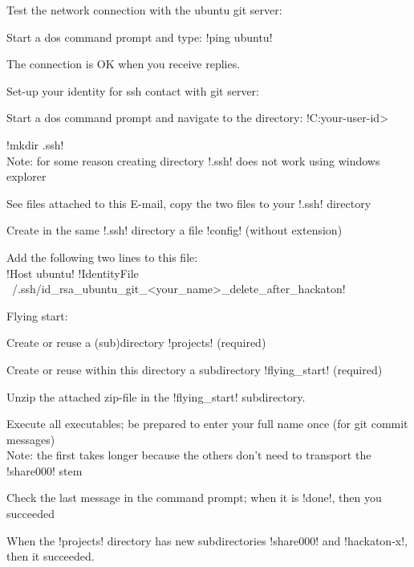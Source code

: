Test the network connection with the ubuntu git server:

\begin{enumerate*}
\item Start a dos command prompt and type:
      !ping ubuntu!
\item The connection is OK when you receive replies.
\end{enumerate*}

Set-up your identity for ssh contact with git server:

\begin{enumerate*}
\item Start a dos command prompt and navigate to the directory: !C:\Users\<your-user-id>\!
\item !mkdir .ssh!\\
      Note: for some reason creating directory !.ssh! does not work using windows explorer
\item See files attached to this E-mail, copy the two files to your !.ssh! directory
\item Create in the same !.ssh! directory a file !config! (without extension)
\item Add the following two lines to this file:\\
      !Host ubuntu!
      !IdentityFile ~/.ssh/id_rsa_ubuntu_git_<your_name>_delete_after_hackaton!
\end{enumerate*}

Flying start:

\begin{enumerate*}
\item Create or reuse a (sub)directory !projects! (required)
\item Create or reuse within this directory a subdirectory !flying_start! (required)
\item Unzip the attached zip-file in the !flying_start! subdirectory.
\item Execute all executables; be prepared to enter your full name once (for git commit messages)\\
      Note: the first takes longer because the others don't need to transport the !share000! stem
\item Check the last message in the command prompt; when it is !done!, then you succeeded
\item When the !projects! directory has new subdirectories !share000! and !hackaton-x!, then it succeeded.
\end{enumerate*}

